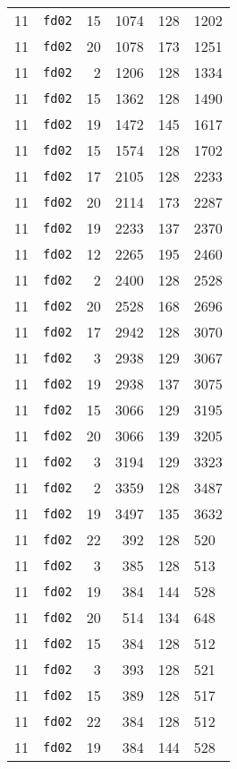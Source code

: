 \documentclass{article}
\begin{document}
\begin{table}[h!]
\begin{tabular}{llrrrl}
    11 & \texttt{fd02} & 15 & 1074 & 128 & 1202 \\
    11 & \texttt{fd02} & 20 & 1078 & 173 & 1251 \\
    11 & \texttt{fd02} & 2 & 1206 & 128 & 1334 \\
    11 & \texttt{fd02} & 15 & 1362 & 128 & 1490 \\
    11 & \texttt{fd02} & 19 & 1472 & 145 & 1617 \\
    11 & \texttt{fd02} & 15 & 1574 & 128 & 1702 \\
    11 & \texttt{fd02} & 17 & 2105 & 128 & 2233 \\
    11 & \texttt{fd02} & 20 & 2114 & 173 & 2287 \\
    11 & \texttt{fd02} & 19 & 2233 & 137 & 2370 \\
    11 & \texttt{fd02} & 12 & 2265 & 195 & 2460 \\
    11 & \texttt{fd02} & 2 & 2400 & 128 & 2528 \\
    11 & \texttt{fd02} & 20 & 2528 & 168 & 2696 \\
    11 & \texttt{fd02} & 17 & 2942 & 128 & 3070 \\
    11 & \texttt{fd02} & 3 & 2938 & 129 & 3067 \\
    11 & \texttt{fd02} & 19 & 2938 & 137 & 3075 \\
    11 & \texttt{fd02} & 15 & 3066 & 129 & 3195 \\
    11 & \texttt{fd02} & 20 & 3066 & 139 & 3205 \\
    11 & \texttt{fd02} & 3 & 3194 & 129 & 3323 \\
    11 & \texttt{fd02} & 2 & 3359 & 128 & 3487 \\
    11 & \texttt{fd02} & 19 & 3497 & 135 & 3632 \\
    11 & \texttt{fd02} & 22 & 392 & 128 & 520 \\
    11 & \texttt{fd02} & 3 & 385 & 128 & 513 \\
    11 & \texttt{fd02} & 19 & 384 & 144 & 528 \\
    11 & \texttt{fd02} & 20 & 514 & 134 & 648 \\
    11 & \texttt{fd02} & 15 & 384 & 128 & 512 \\
    11 & \texttt{fd02} & 3 & 393 & 128 & 521 \\
    11 & \texttt{fd02} & 15 & 389 & 128 & 517 \\
    11 & \texttt{fd02} & 22 & 384 & 128 & 512 \\
    11 & \texttt{fd02} & 19 & 384 & 144 & 528 \\

\end{tabular}
\end{table}
\end{document}

